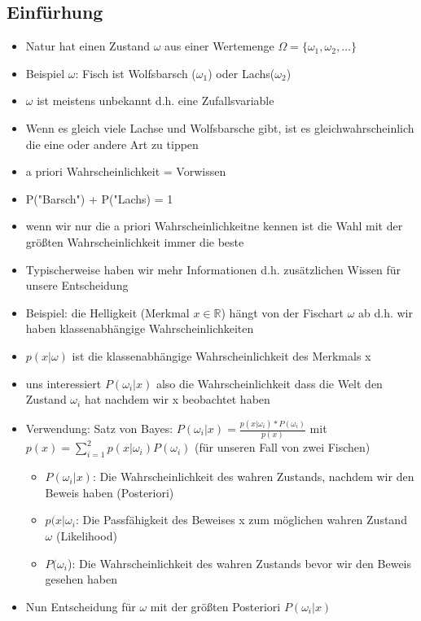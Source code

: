 \documentclass{article} %
\begin{document}
	\subsection{Einfürhung}	
	\begin{itemize}
		\item Natur hat einen Zustand $\omega$ aus einer Wertemenge $\Omega = \{\omega_1,\omega_2,\dots\}$
		\item Beispiel $\omega$: Fisch ist Wolfsbarsch ($\omega_1$) oder Lachs($\omega_2$) 
		\item $\omega$ ist meistens unbekannt d.h. eine Zufallsvariable
		\item Wenn es gleich viele Lachse und Wolfsbarsche gibt, ist es gleichwahrscheinlich die eine oder andere Art zu tippen
		\item a priori Wahrscheinlichkeit = Vorwissen
		\item P("Barsch") + P("Lachs) = 1
		\item wenn wir nur die a priori Wahrscheinlichkeitne kennen ist die Wahl mit der größten Wahrscheinlichkeit immer die beste
		\item Typischerweise haben wir mehr Informationen d.h. zusätzlichen Wissen für unsere Entscheidung
		\item Beispiel: die Helligkeit (Merkmal $x \in \mathbb{R}$) hängt von der Fischart $\omega$ ab d.h. wir haben klassenabhängige Wahrscheinlichkeiten
		\item $p(x|\omega)$ ist die klassenabhängige Wahrscheinlichkeit des Merkmals x 
		\item uns interessiert $P(\omega_i|x)$ also die Wahrscheinlichkeit dass die Welt den Zustand $\omega_i$ hat nachdem wir x beobachtet haben
		\item Verwendung: Satz von Bayes: $P(\omega_i|x) = \frac{p(x|\omega_i)*P(\omega_i)}{p(x)}$ mit $p(x) = \sum_{i=1}^{2} p(x|\omega_i) P(\omega_i)$ (für unseren Fall von zwei Fischen)
		\begin{itemize}
			\item $P(\omega_i|x)$: Die Wahrscheinlichkeit des wahren Zustands, nachdem wir den Beweis haben (Posteriori)
			\item $p(x|\omega_i$: Die Passfähigkeit des Beweises x zum möglichen wahren Zustand $\omega$ (Likelihood)
			\item $P(\omega_i$): Die Wahrscheinlichkeit des wahren Zustands bevor wir den Beweis gesehen haben
		\end{itemize}
		\item Nun Entscheidung für $\omega$ mit der größten Posteriori $P(\omega_i|x)$ 
	\end{itemize}
\end{document}
